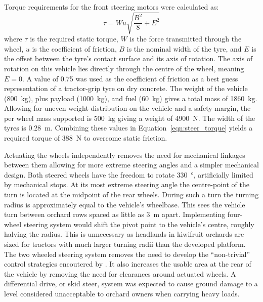 \documentclass[preprint,authoryear,12pt]{elsarticle}
\begin{document}
        Torque requirements for the front steering motors were calculated as:
        \begin{equation}
        \label{eqn:steer_torque}
        \tau = W u \sqrt{\frac{B^2}{8} + E^2}
        \end{equation}
        where $\tau$ is the required static torque, $W$ is the force transmitted through the wheel, $u$ is the coefficient of friction, $B$ is the nominal width of the tyre, and $E$ is the offset between the tyre's contact surface and its axis of rotation.
        The axis of rotation on this vehicle lies directly through the centre of the wheel, meaning $E=0$.
        A value of 0.75 was used as the coefficient of friction as a best guess representation of a tractor-grip tyre on dry concrete.
        The weight of the vehicle (\SI{800}{\kilo\gram}), plus payload (\SI{1000}{\kilo\gram}), and fuel (\SI{60}{\kilo\gram}) gives a total mass of \SI{1860}{\kilo\gram}.
        Allowing for uneven weight distribution on the vehicle and a safety margin, the per wheel mass supported is \SI{500}{\kilo\gram} giving a weight of \SI{4900}{\newton}.
        The width of the tyres is \SI{0.28}{\meter}.
        Combining these values in Equation~\ref{eqn:steer_torque} yields a required torque of \SI{388}{\newton} to overcome static friction.

        Actuating the wheels independently removes the need for mechanical linkages between them allowing for more extreme steering angles and a simpler mechanical design.
        Both steered wheels have the freedom to rotate \SI{330}{\degree}, artificially limited by mechanical stops.
        At its most extreme steering angle the centre-point of the turn is located at the midpoint of the rear wheels.
        During such a turn the turning radius is approximately equal to the vehicle's wheelbase.
        This sees the vehicle turn between orchard rows spaced as little as \SI{3}{\meter} apart.
        Implementing four-wheel steering system would shift the pivot point to the vehicle's centre, roughly halving the radius.
        This is unnecessary as headlands in kiwifruit orchards are sized for tractors with much larger turning radii than the developed platform.
        The two wheeled steering system removes the need to develop the ``non-trivial'' control strategies encoutered by \cite{Bak2004}.
        It also increases the usable area at the rear of the vehicle by removing the need for clearances around actuated wheels.
        A differential drive, or skid steer, system was expected to cause ground damage to a level considered unacceptable to orchard owners when carrying heavy loads.
\end{document}
